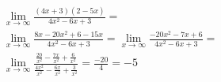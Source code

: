 \begin{ex}
\begin{align}
&\lim_{x\rightarrow \infty} \frac{(4x+3)(2-5x)}{4x^2-6x+3}=\nonumber\\
&\lim_{x\rightarrow \infty} \frac{8x-20x^2+6-15x}{4x^2-6x+3}=\lim_{x\rightarrow \infty} \frac{-20x^2-7x+6}{4x^2-6x+3}=\nonumber\\
&\lim_{x\rightarrow \infty} \frac{\frac{20}{x^2}-\frac{7x}{x^2}+\frac{6}{x^2}}{\frac{4x^2}{x^2}-\frac{6x}{x^2}+\frac{3}{x^2}}=\frac{-20}{4}=-5\nonumber
\end{align}
\end{ex}
